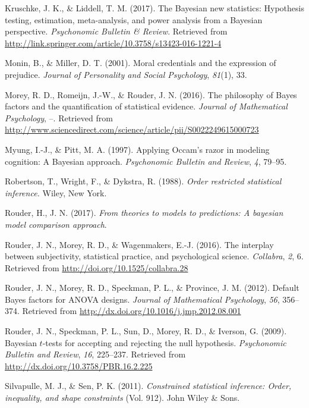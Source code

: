 \documentclass[english,man]{apa6}
\theoremstyle{definition}
\theoremstyle{definition}
\theoremstyle{remark}
\begin{document}
\hypertarget{ref-Kruschke:Liddell:2017}{}
Kruschke, J. K., \& Liddell, T. M. (2017). The Bayesian new statistics:
Hypothesis testing, estimation, meta-analysis, and power analysis from a
Bayesian perspective. \emph{Psychonomic Bulletin \& Review}. Retrieved
from \url{http://link.springer.com/article/10.3758/s13423-016-1221-4}

\hypertarget{ref-Monin:Miller:2001}{}
Monin, B., \& Miller, D. T. (2001). Moral credentials and the expression
of prejudice. \emph{Journal of Personality and Social Psychology},
\emph{81}(1), 33.

\hypertarget{ref-Morey:etal:2016}{}
Morey, R. D., Romeijn, J.-W., \& Rouder, J. N. (2016). The philosophy of
Bayes factors and the quantification of statistical evidence.
\emph{Journal of Mathematical Psychology}, --. Retrieved from
\url{http://www.sciencedirect.com/science/article/pii/S0022249615000723}

\hypertarget{ref-Myung:Pitt:1997}{}
Myung, I.-J., \& Pitt, M. A. (1997). Applying Occam's razor in modeling
cognition: A Bayesian approach. \emph{Psychonomic Bulletin and Review},
\emph{4}, 79--95.

\hypertarget{ref-Robertson:etal:1988}{}
Robertson, T., Wright, F., \& Dykstra, R. (1988). \emph{Order restricted
statistical inference.} Wiley, New York.

\hypertarget{ref-Rouder:etal:2017}{}
Rouder, H., J. N. (2017). \emph{From theories to models to predictions:
A bayesian model comparison approach}.

\hypertarget{ref-Rouder:etal:2016b}{}
Rouder, J. N., Morey, R. D., \& Wagenmakers, E.-J. (2016). The interplay
between subjectivity, statistical practice, and psychological science.
\emph{Collabra}, \emph{2}, 6. Retrieved from
\url{http://doi.org/10.1525/collabra.28}

\hypertarget{ref-Rouder:etal:2012}{}
Rouder, J. N., Morey, R. D., Speckman, P. L., \& Province, J. M. (2012).
Default Bayes factors for ANOVA designs. \emph{Journal of Mathematical
Psychology}, \emph{56}, 356--374. Retrieved from
\url{http://dx.doi.org/10.1016/j.jmp.2012.08.001}

\hypertarget{ref-Rouder:etal:2009a}{}
Rouder, J. N., Speckman, P. L., Sun, D., Morey, R. D., \& Iverson, G.
(2009). Bayesian \(t\)-tests for accepting and rejecting the null
hypothesis. \emph{Psychonomic Bulletin and Review}, \emph{16}, 225--237.
Retrieved from \url{http://dx.doi.org/10.3758/PBR.16.2.225}

\hypertarget{ref-Silvapulle:Senn:2011}{}
Silvapulle, M. J., \& Sen, P. K. (2011). \emph{Constrained statistical
inference: Order, inequality, and shape constraints} (Vol. 912). John
Wiley \& Sons.
\end{document}

